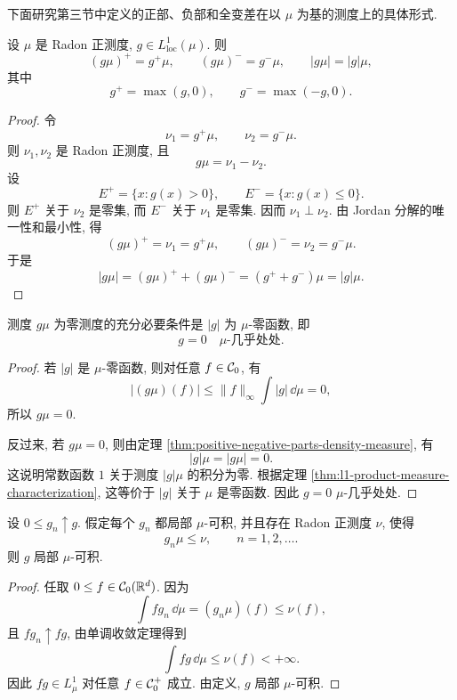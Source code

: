 下面研究第三节中定义的正部、负部和全变差在以 \(\mu\) 为基的测度上的具体形式.

\begin{thm}\label{thm:positive-negative-parts-density-measure}
	设 \(\mu\) 是 Radon 正测度, \(g\in L^1_{\operatorname{loc}}(\mu)\). 则
	\[
	(g\mu)^+=g^+\mu,
	\qquad
	(g\mu)^-=g^-\mu,
	\qquad
	|g\mu|=|g|\mu,
	\]
	其中
	\[
	g^+=\max(g,0),
	\qquad
	g^-=\max(-g,0).
	\]
\end{thm}

\begin{proof}
	令
	\[
	\nu_1=g^+\mu,
	\qquad
	\nu_2=g^-\mu.
	\]
	则 \(\nu_1,\nu_2\) 是 Radon 正测度, 且
	\[
	g\mu=\nu_1-\nu_2.
	\]
	设
	\[
	E^+=\{x:g(x)>0\},
	\qquad
	E^-=\{x:g(x)\leq0\}.
	\]
	则 \(E^+\) 关于 \(\nu_2\) 是零集, 而 \(E^-\) 关于 \(\nu_1\) 是零集. 因而 \(\nu_1\perp\nu_2\). 由 Jordan 分解的唯一性和最小性, 得
	\[
	(g\mu)^+=\nu_1=g^+\mu,
	\qquad
	(g\mu)^-=\nu_2=g^-\mu.
	\]
	于是
	\[
	|g\mu|=(g\mu)^++(g\mu)^-=(g^++g^-)\mu=|g|\mu.
	\]
\end{proof}

\begin{thm}\label{thm:zero-product-measure-iff-density-zero}
	测度 \(g\mu\) 为零测度的充分必要条件是 \(|g|\) 为 \(\mu\)-零函数, 即
	\[
	g=0\quad \mu\text{-几乎处处}.
	\]
\end{thm}

\begin{proof}
	若 \(|g|\) 是 \(\mu\)-零函数, 则对任意 \(f\in\mathcal{C}_0\), 有
	\[
	|(g\mu)(f)|\leq \|f\|_\infty\int |g|\,\dd\mu=0,
	\]
	所以 \(g\mu=0\).
	
	反过来, 若 \(g\mu=0\), 则由定理 \ref{thm:positive-negative-parts-density-measure}, 有
	\[
	|g|\mu=|g\mu|=0.
	\]
	这说明常数函数 \(1\) 关于测度 \(|g|\mu\) 的积分为零. 根据定理 \ref{thm:l1-product-measure-characterization}, 这等价于 \(|g|\) 关于 \(\mu\) 是零函数. 因此 \(g=0\) \(\mu\)-几乎处处.
\end{proof}

\begin{thm}\label{thm:monotone-density-dominated-measures}
	设 \(0\leq g_n\uparrow g\). 假定每个 \(g_n\) 都局部 \(\mu\)-可积, 并且存在 Radon 正测度 \(\nu\), 使得
	\[
	g_n\mu\leq \nu,
	\qquad n=1,2,\ldots.
	\]
	则 \(g\) 局部 \(\mu\)-可积.
\end{thm}

\begin{proof}
	任取 \(0\leq f\in\mathcal{C}_0(\mathbb{R}^d)\). 因为
	\[
	\int fg_n\,\dd\mu=(g_n\mu)(f)\leq \nu(f),
	\]
	且 \(fg_n\uparrow fg\), 由单调收敛定理得到
	\[
	\int fg\,\dd\mu\leq \nu(f)<+\infty.
	\]
	因此 \(fg\in L^1_\mu\) 对任意 \(f\in\mathcal{C}_0^+\) 成立. 由定义, \(g\) 局部 \(\mu\)-可积.
\end{proof}


